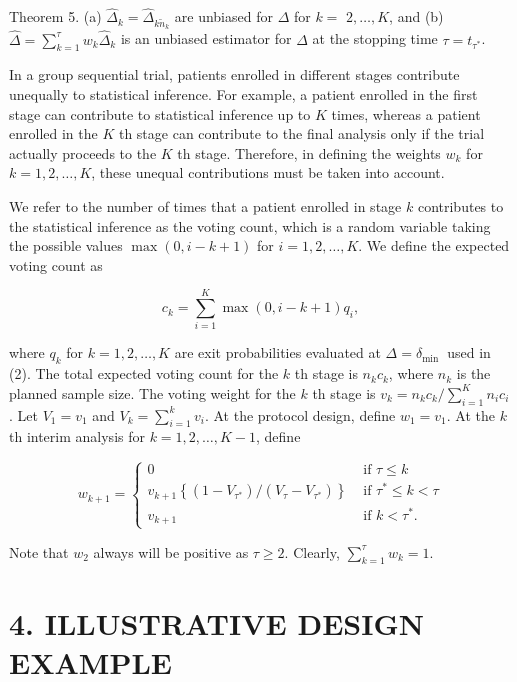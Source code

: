 \documentclass[10pt]{article}
\begin{document}
Theorem 5. (a) $\hat{\Delta}_{k}=\hat{\Delta}_{k \tilde{n}_{k}}$ are unbiased for $\Delta$ for $k=$ $2, \ldots, K$, and (b) $\hat{\Delta}=\sum_{k=1}^{\tau} w_{k} \hat{\Delta}_{k}$ is an unbiased estimator for $\Delta$ at the stopping time $\tau=t_{\tau^{*}}$.

In a group sequential trial, patients enrolled in different stages contribute unequally to statistical inference. For example, a patient enrolled in the first stage can contribute to statistical inference up to $K$ times, whereas a patient enrolled in the $K$ th stage can contribute to the final analysis only if the trial actually proceeds to the $K$ th stage. Therefore, in defining the weights $w_{k}$ for $k=1,2, \ldots, K$, these unequal contributions must be taken into account.

We refer to the number of times that a patient enrolled in stage $k$ contributes to the statistical inference as the voting count, which is a random variable taking the possible values $\max (0, i-k+1)$ for $i=1,2, \ldots, K$. We define the expected voting count as


\begin{equation*}
c_{k}=\sum_{i=1}^{K} \max (0, i-k+1) q_{i}, \tag{13}
\end{equation*}


where $q_{k}$ for $k=1,2, \ldots, K$ are exit probabilities evaluated at $\Delta=\delta_{\text {min }}$ used in (2). The total expected voting count for the $k$ th stage is $n_{k} c_{k}$, where $n_{k}$ is the planned sample size. The voting weight for the $k$ th stage is $v_{k}=n_{k} c_{k} / \sum_{i=1}^{K} n_{i} c_{i}$. Let $V_{1}=v_{1}$ and $V_{k}=\sum_{i=1}^{k} v_{i}$. At the protocol design, define $w_{1}=v_{1}$. At the $k$ th interim analysis for $k=1,2, \ldots, K-1$, define

\[
w_{k+1}= \begin{cases}0 & \text { if } \tau \leq k  \tag{14}\\ v_{k+1}\left\{\left(1-V_{\tau^{*}}\right) /\left(V_{\tau}-V_{\tau^{*}}\right)\right\} & \text { if } \tau^{*} \leq k<\tau \\ v_{k+1} & \text { if } k<\tau^{*} .\end{cases}
\]

Note that $w_{2}$ always will be positive as $\tau \geq 2$. Clearly, $\sum_{k=1}^{\tau} w_{k}=1$.

\section*{4. ILLUSTRATIVE DESIGN EXAMPLE}
\end{document}
